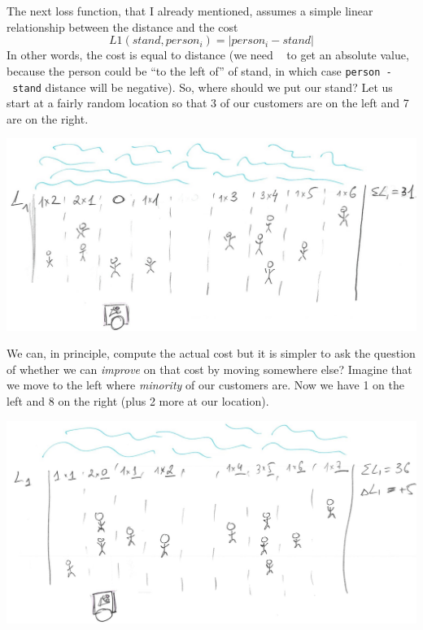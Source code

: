 \documentclass[
]{book}
\begin{document}
The next loss function, that I already mentioned, assumes a simple linear relationship between the distance and the cost
\[L1(stand, person_i) = |person_i - stand|\]
In other words, the cost is equal to distance (we need \texttt{\textbar{}\ \textbar{}} to get an absolute value, because the person could be ``to the left of'' of stand, in which case \texttt{person\ -\ stand} distance will be negative). So, where should we put our stand? Let us start at a fairly random location so that 3 of our customers are on the left and 7 are on the right.

\begin{center}\includegraphics[width=1\linewidth]{images/loss-functions-L1-off-median} \end{center}

We can, in principle, compute the actual cost but it is simpler to ask the question of whether we can \emph{improve} on that cost by moving somewhere else? Imagine that we move to the left where \emph{minority} of our customers are. Now we have 1 on the left and 8 on the right (plus 2 more at our location).

\begin{center}\includegraphics[width=1\linewidth]{images/loss-functions-L1-left} \end{center}
\end{document}
